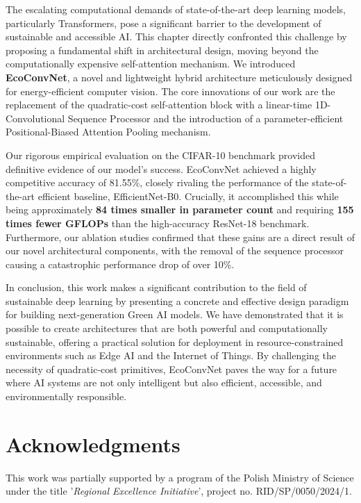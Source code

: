 \documentclass[12pt, a4paper]{article}
\begin{document}
The escalating computational demands of state-of-the-art deep learning models, particularly Transformers, pose a significant barrier to the development of sustainable and accessible AI. This chapter directly confronted this challenge by proposing a fundamental shift in architectural design, moving beyond the computationally expensive self-attention mechanism. We introduced \textbf{EcoConvNet}, a novel and lightweight hybrid architecture meticulously designed for energy-efficient computer vision. The core innovations of our work are the replacement of the quadratic-cost self-attention block with a linear-time 1D-Convolutional Sequence Processor and the introduction of a parameter-efficient Positional-Biased Attention Pooling mechanism.

Our rigorous empirical evaluation on the CIFAR-10 benchmark provided definitive evidence of our model's success. EcoConvNet achieved a highly competitive accuracy of 81.55\%, closely rivaling the performance of the state-of-the-art efficient baseline, EfficientNet-B0. Crucially, it accomplished this while being approximately \textbf{84 times smaller in parameter count} and requiring \textbf{155 times fewer GFLOPs} than the high-accuracy ResNet-18 benchmark. Furthermore, our ablation studies confirmed that these gains are a direct result of our novel architectural components, with the removal of the sequence processor causing a catastrophic performance drop of over 10\%.

In conclusion, this work makes a significant contribution to the field of sustainable deep learning by presenting a concrete and effective design paradigm for building next-generation Green AI models. We have demonstrated that it is possible to create architectures that are both powerful and computationally sustainable, offering a practical solution for deployment in resource-constrained environments such as Edge AI and the Internet of Things. By challenging the necessity of quadratic-cost primitives, EcoConvNet paves the way for a future where AI systems are not only intelligent but also efficient, accessible, and environmentally responsible.




 
\section*{Acknowledgments}
This work was partially supported by a program of the Polish Ministry of Science under the title '\textit{Regional Excellence Initiative}', project no. RID/SP/0050/2024/1.

\printbibliography
\end{document}
